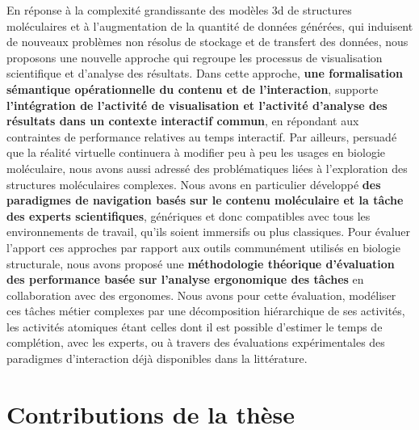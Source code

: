 


\mtcaddchapter



En réponse à la complexité grandissante des modèles 3d de structures moléculaires et à l'augmentation de la quantité de données générées, qui induisent de nouveaux problèmes non résolus de stockage et de transfert des données, nous proposons une nouvelle approche qui regroupe les processus de visualisation scientifique et d'analyse des résultats. Dans cette approche, \textbf{une formalisation sémantique opérationnelle du contenu et de l'interaction}, supporte \textbf{l'intégration de l'activité de visualisation et l'activité d'analyse des résultats dans un contexte interactif commun}, en répondant aux contraintes de performance relatives au temps interactif. Par ailleurs, persuadé que la réalité virtuelle continuera à modifier peu à peu les usages en biologie moléculaire, nous avons aussi adressé des problématiques liées à l'exploration des structures moléculaires complexes. Nous avons en particulier développé \textbf{des paradigmes de navigation basés sur le contenu moléculaire et la tâche des experts scientifiques}, génériques et donc compatibles avec tous les environnements de travail, qu'ils soient immersifs ou plus classiques. Pour évaluer l'apport ces approches par rapport aux outils communément utilisés en biologie structurale, nous avons proposé une \textbf{méthodologie théorique d'évaluation des performance basée sur l'analyse ergonomique des tâches} en collaboration avec des ergonomes. Nous avons pour cette évaluation, modéliser ces tâches métier complexes par une décomposition hiérarchique de ses activités, les activités atomiques étant celles dont il est possible d'estimer le temps de complétion, avec les experts, ou à travers des évaluations expérimentales des paradigmes d'interaction déjà disponibles dans la littérature.

\section*{Contributions de la thèse}

